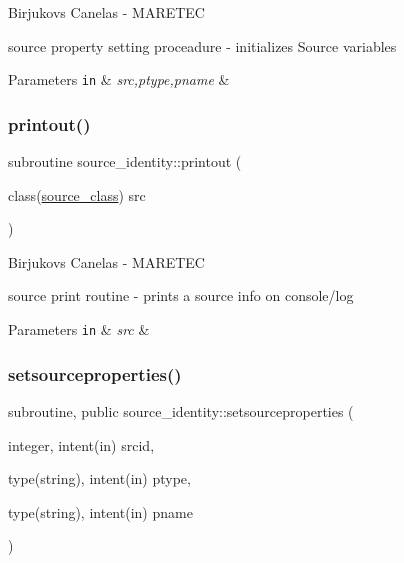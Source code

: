 Birjukovs Canelas -\/ M\+A\+R\+E\+T\+EC 

source property setting proceadure -\/ initializes Source variables 
\begin{DoxyParams}[1]{Parameters}
\mbox{\tt in}  & {\em src,ptype,pname} & \\
\hline
\end{DoxyParams}
\mbox{\label{namespacesource__identity_a9715a7d707b4c80aa2d2ebd08712f6a9}} 
\subsubsection{\texorpdfstring{printout()}{printout()}}
{\footnotesize\ttfamily subroutine source\+\_\+identity\+::printout (\begin{DoxyParamCaption}\item[{class(\mbox{\hyperlink{structsource__identity_1_1source__class}{source\+\_\+class}})}]{src }\end{DoxyParamCaption})\hspace{0.3cm}{\ttfamily [private]}}



Birjukovs Canelas -\/ M\+A\+R\+E\+T\+EC 

source print routine -\/ prints a source info on console/log 
\begin{DoxyParams}[1]{Parameters}
\mbox{\tt in}  & {\em src} & \\
\hline
\end{DoxyParams}
\mbox{\label{namespacesource__identity_abf228e9179ba7c28cc5de2f63562ac25}} 
\subsubsection{\texorpdfstring{setsourceproperties()}{setsourceproperties()}}
{\footnotesize\ttfamily subroutine, public source\+\_\+identity\+::setsourceproperties (\begin{DoxyParamCaption}\item[{integer, intent(in)}]{srcid,  }\item[{type(string), intent(in)}]{ptype,  }\item[{type(string), intent(in)}]{pname }\end{DoxyParamCaption})}



